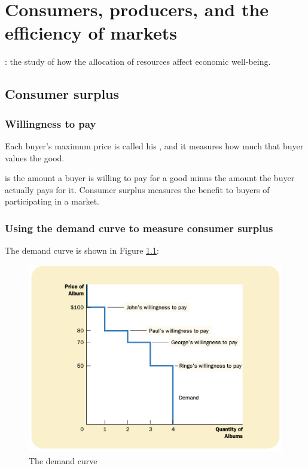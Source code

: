 
\chapter{Consumers, producers, and the efficiency of markets}

: the study of how the allocation of resources affect economic well-being.


\section{Consumer surplus}

\subsection{Willingness to pay}

Each buyer's maximum price is called his , and it measures how much that buyer values the good.

 is the amount a buyer is willing to pay for a good minus the amount the buyer actually pays for it.
Consumer surplus measures the benefit to buyers of participating in a market.

\subsection{Using the demand curve to measure consumer surplus}

The demand curve is shown in Figure \ref{fig:the-demand-curve}:

\begin{figure}[!ht]
  \centering
  \includegraphics[width=\textwidth]{pics/willingness-to-pay}
  \caption{The demand curve}
  \label{fig:the-demand-curve}
\end{figure}

